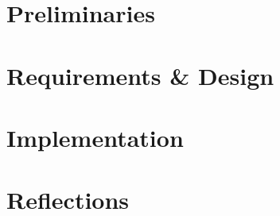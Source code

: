 


\pagestyle{empty} %





%
\listoftodos
\cleardoublepage
{}
\pagestyle{fancy} %
\setcounter{tocdepth}{1}
\tableofcontents
\cleardoublepage





\part{Preliminaries}

\part{Requirements \& Design}\label{chap:design}

\part{Implementation}
\label{chap:implementation}

\part{Reflections}


\printbibliography[heading=bibintoc]
\label{bib:mybiblio}

\appendix
{}

\label{lastpage}


